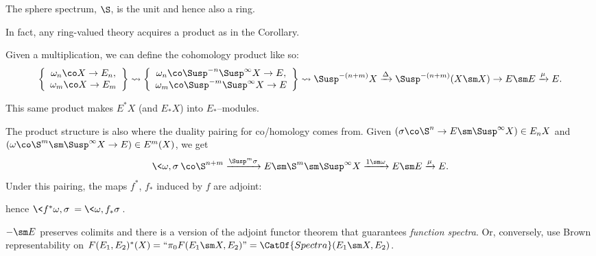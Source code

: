 \begin{example}
The sphere spectrum, $\S$, is the unit and hence also a ring.
\end{example}

\begin{remark}
In fact, any ring-valued theory acquires a product as in the Corollary.
\end{remark}

Given a multiplication, we can define the cohomology product like so:
\[\left\{ \begin{array}{c} \omega_n\co X \to E_n, \\ \omega_m\co X \to E_m \end{array}\right\} \rightsquigarrow \left\{ \begin{array}{c} \omega_n\co \Susp^{-n} \Susp^\infty X \to E, \\ \omega_m\co \Susp^{-m} \Susp^\infty X \to E \end{array}\right\} \rightsquigarrow \Susp^{-(n+m)} X \xrightarrow{\Delta} \Susp^{-(n+m)}(X \sm X) \to E \sm E \xrightarrow\mu E.\]

\begin{remark}
This same product makes $E^* X$ (and $E_* X$) into $E_*$--modules.
\end{remark}

The product structure is also where the duality pairing for co/homology comes from.  Given $(\sigma\co \S^n \to E \sm \Susp^\infty X) \in E_n X$ and $(\omega \co \S^m \sm \Susp^\infty X \to E) \in E^m(X)$, we get \[\<\omega, \sigma\>\co \S^{n+m} \xrightarrow{\Susp^m \sigma} E \sm \S^m \sm \Susp^\infty X \xrightarrow{1 \sm \omega} E \sm E \xrightarrow\mu E.\]  Under this pairing, the maps $f^*$, $f_*$ induced by $f$ are adjoint:
\begin{center}
\end{center}
hence $\<f^* \omega, \sigma\> = \<\omega, f_* \sigma\>$.

\begin{remark}
$- \sm E$ preserves colimits and there is a version of the adjoint functor theorem that guarantees \emph{function spectra}.  Or, conversely, use Brown representability on $F(E_1, E_2)^*(X) = \text{``}\pi_0 F(E_1 \sm X, E_2)\text{''} = \CatOf{Spectra}(E_1 \sm X, E_2)$.
\end{remark}




